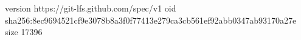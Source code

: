 version https://git-lfs.github.com/spec/v1
oid sha256:8ec9694521cf9e3078b8a3f0f77413e279ca3cb561ef92abb0347ab93170a27e
size 17396
